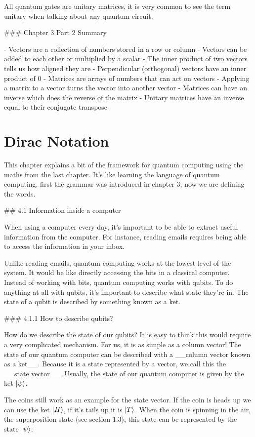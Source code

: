 \documentclass{book}
\begin{document}
All quantum gates are unitary matrices, it is very common to see the term unitary when talking about any quantum circuit. 


### Chapter 3 Part 2 Summary 

- Vectors are a collection of numbers stored in a row or column
- Vectors can be added to each other or multiplied by a scalar
- The inner product of two vectors tells us how aligned they are
- Perpendicular (orthogonal) vectors have an inner product of 0
- Matrices are arrays of numbers that can act on vectors 
- Applying a matrix to a vector turns the vector into another vector
- Matrices can have an inverse which does the reverse of the matrix 
- Unitary matrices have an inverse equal to their conjugate transpose


\section{Dirac Notation}
This chapter explains a bit of the framework for quantum computing using the maths from the last chapter. It's like learning the language of quantum computing, first the grammar was introduced in chapter 3, now we are defining the words.  

## 4.1 Information inside a computer

When using a computer every day, it's important to be able to extract useful information from the computer. For instance, reading emails requires being able to access the information in your inbox. 

Unlike reading emails, quantum computing works at the lowest level of the system. It would be like directly accessing the bits in a classical computer. Instead of working with bits, quantum computing works with qubits. To do anything at all with qubits, it's important to describe what state they're in. The state of a qubit is described by something known as a ket. 


### 4.1.1 How to describe qubits?


How do we describe the state of our qubits? It is easy to think this would require a very complicated mechanism. For us, it is as simple as a column vector! The state of our quantum computer can be described with a __column vector known as a ket__. Because it is a state represented by a vector, we call this the __state vector__. Usually, the state of our quantum computer is given by the ket $\ket{\psi}$.

The coins still work as an example for the state vector. If the coin is heads up we can use the ket $\ket{H}$, if it's tails up it is $\ket{T}$. When the coin is spinning in the air, the superposition state (see section 1.3), this state can be represented by the state $\ket{\psi}$: 
\end{document}
